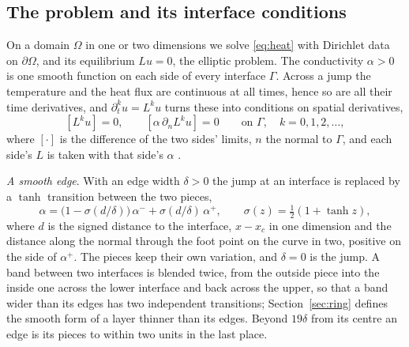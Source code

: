 \documentclass[11pt]{amsart}
\theoremstyle{definition}
\theoremstyle{remark}
\newcommand{\para}[1]{\par\smallskip\noindent\textit{#1}.\enspace}
\begin{document}
\subsection{The problem and its interface conditions}
\label{sec:problem}
On a domain $\Omega$ in one or two dimensions we solve \eqref{eq:heat} with
Dirichlet data on $\partial \Omega$, and its equilibrium $L u = 0$, the
elliptic problem. The conductivity $\alpha > 0$ is one smooth function on
each side of every interface $\Gamma$. Across a jump the temperature and the
heat flux are continuous at all times, hence so are all their time
derivatives, and $\partial_t^k u = L^k u$ turns these into conditions on
spatial derivatives,
\begin{equation}
  \label{eq:continuity}
  [L^k u] = 0, \qquad [\alpha\, \partial_n L^k u] = 0 \qquad \text{on }
  \Gamma, \quad k = 0, 1, 2, \ldots,
\end{equation}
where $[\cdot]$ is the difference of the two sides' limits, $n$ the normal
to $\Gamma$, and each side's $L$ is taken with that side's $\alpha$
\cite{Martin2016,MartinFornberg2017heat}.

\para{A smooth edge}
With an edge width $\delta > 0$ the jump at an interface is replaced by a
$\tanh$ transition between the two pieces,
\begin{equation}
  \label{eq:edge}
  \alpha = \bigl(1 - \sigma(d / \delta)\bigr)\, \alpha^- + \sigma(d / \delta)\,
  \alpha^+, \qquad \sigma(z) = \tfrac12 (1 + \tanh z),
\end{equation}
where $d$ is the signed distance to the interface, $x - x_c$ in one
dimension and the distance along the normal through the foot point on the
curve in two, positive on the side of $\alpha^+$. The pieces keep their own
variation, and $\delta = 0$ is the jump. A band between two interfaces is
blended twice, from the outside piece into the inside one across the lower
interface and back across the upper, so that a band wider than its edges
has two independent transitions; Section~\ref{sec:ring} defines the smooth
form of a layer thinner than its edges. Beyond $19\delta$ from its centre
an edge is its pieces to within two units in the last place.
\end{document}
